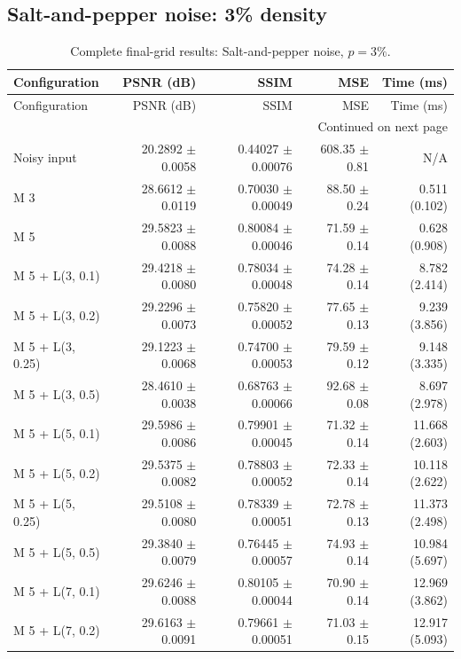 \subsection{Salt-and-pepper noise: 3\% density}
\begingroup
\footnotesize
\setlength{\tabcolsep}{4pt}
\begin{longtable}{lrrrr}
\caption{Complete final-grid results: Salt-and-pepper noise, $p=3\%$.}\\
\toprule Configuration & PSNR (dB) & SSIM & MSE & Time (ms) \\ \midrule
\endfirsthead
\toprule Configuration & PSNR (dB) & SSIM & MSE & Time (ms) \\ \midrule
\endhead
\midrule \multicolumn{5}{r}{Continued on next page}\\
\endfoot
\bottomrule
\endlastfoot
Noisy input & 20.2892 $\pm$ 0.0058 & 0.44027 $\pm$ 0.00076 & 608.35 $\pm$ 0.81 & N/A \\
M 3 & 28.6612 $\pm$ 0.0119 & 0.70030 $\pm$ 0.00049 & 88.50 $\pm$ 0.24 & 0.511 (0.102) \\
M 5 & 29.5823 $\pm$ 0.0088 & 0.80084 $\pm$ 0.00046 & 71.59 $\pm$ 0.14 & 0.628 (0.908) \\
M 5 + L(3, 0.1) & 29.4218 $\pm$ 0.0080 & 0.78034 $\pm$ 0.00048 & 74.28 $\pm$ 0.14 & 8.782 (2.414) \\
M 5 + L(3, 0.2) & 29.2296 $\pm$ 0.0073 & 0.75820 $\pm$ 0.00052 & 77.65 $\pm$ 0.13 & 9.239 (3.856) \\
M 5 + L(3, 0.25) & 29.1223 $\pm$ 0.0068 & 0.74700 $\pm$ 0.00053 & 79.59 $\pm$ 0.12 & 9.148 (3.335) \\
M 5 + L(3, 0.5) & 28.4610 $\pm$ 0.0038 & 0.68763 $\pm$ 0.00066 & 92.68 $\pm$ 0.08 & 8.697 (2.978) \\
M 5 + L(5, 0.1) & 29.5986 $\pm$ 0.0086 & 0.79901 $\pm$ 0.00045 & 71.32 $\pm$ 0.14 & 11.668 (2.603) \\
M 5 + L(5, 0.2) & 29.5375 $\pm$ 0.0082 & 0.78803 $\pm$ 0.00052 & 72.33 $\pm$ 0.14 & 10.118 (2.622) \\
M 5 + L(5, 0.25) & 29.5108 $\pm$ 0.0080 & 0.78339 $\pm$ 0.00051 & 72.78 $\pm$ 0.13 & 11.373 (2.498) \\
M 5 + L(5, 0.5) & 29.3840 $\pm$ 0.0079 & 0.76445 $\pm$ 0.00057 & 74.93 $\pm$ 0.14 & 10.984 (5.697) \\
M 5 + L(7, 0.1) & 29.6246 $\pm$ 0.0088 & 0.80105 $\pm$ 0.00044 & 70.90 $\pm$ 0.14 & 12.969 (3.862) \\
M 5 + L(7, 0.2) & 29.6163 $\pm$ 0.0091 & 0.79661 $\pm$ 0.00051 & 71.03 $\pm$ 0.15 & 12.917 (5.093) \\

\end{longtable}
